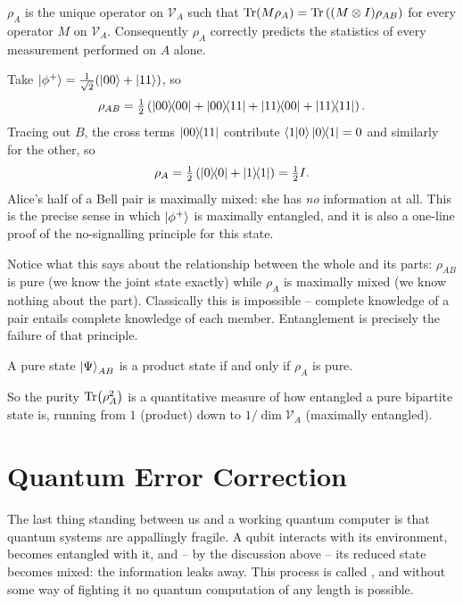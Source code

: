 \documentclass[a4paper]{scrartcl}
\newcommand{\Vs}{\mathcal{V}}
\begin{document}
\begin{proposition}
	$\rho_A$ is the unique operator on $\Vs_A$ such that $\Tr(M\rho_A) = \Tr\left((M\otimes I)\rho_{AB}\right)$ for every operator $M$ on $\Vs_A$. Consequently $\rho_A$ correctly predicts the statistics of every measurement performed on $A$ alone.
\end{proposition}

\begin{example}
	Take $\ket{\phi^+} = \tfrac1{\sqrt2}(\ket{00}+\ket{11})$, so
	$$\rho_{AB} = \tfrac12\left(\op{00}{00}+\op{00}{11}+\op{11}{00}+\op{11}{11}\right).$$
	Tracing out $B$, the cross terms $\op{00}{11}$ contribute $\ip{1}{0}\op{0}{1} = 0$ and similarly for the other, so
	$$\rho_A = \tfrac12\left(\op{0}{0}+\op{1}{1}\right) = \tfrac12I.$$
	Alice's half of a Bell pair is maximally mixed: she has \emph{no} information at all. This is the precise sense in which $\ket{\phi^+}$ is maximally entangled, and it is also a one-line proof of the no-signalling principle for this state.
\end{example}

Notice what this says about the relationship between the whole and its parts: $\rho_{AB}$ is pure (we know the joint state exactly) while $\rho_A$ is maximally mixed (we know nothing about the part). Classically this is impossible -- complete knowledge of a pair entails complete knowledge of each member. Entanglement is precisely the failure of that principle.

\begin{proposition}
	A pure state $\ket{\Psi}_{AB}$ is a product state if and only if $\rho_A$ is pure.
\end{proposition}

So the purity $\Tr(\rho_A^2)$ is a quantitative measure of how entangled a pure bipartite state is, running from $1$ (product) down to $1/\dim\Vs_A$ (maximally entangled).

\section{Quantum Error Correction}

The last thing standing between us and a working quantum computer is that quantum systems are appallingly fragile. A qubit interacts with its environment, becomes entangled with it, and -- by the discussion above -- its reduced state becomes mixed: the information leaks away. This process is called , and without some way of fighting it no quantum computation of any length is possible.
\end{document}
